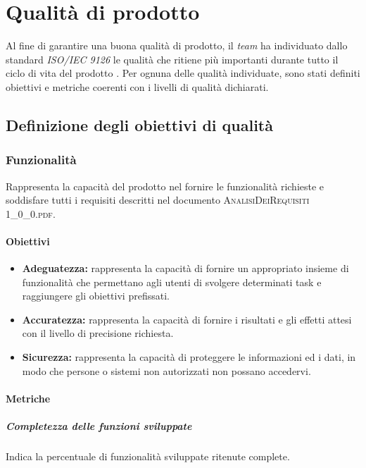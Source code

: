 \newpage
\section{Qualità di prodotto}
	
Al fine di garantire una buona qualità di prodotto, il \textit{team} ha individuato dallo standard \textit{ISO/IEC 9126} le qualità che ritiene più importanti durante tutto il ciclo di vita del prodotto \progetto. Per ognuna delle qualità individuate, sono stati definiti obiettivi e metriche coerenti con i livelli di qualità dichiarati.

\subsection{Definizione degli obiettivi di qualità}

	\subsubsection{Funzionalità}
	Rappresenta la capacità del prodotto nel fornire le funzionalità richieste e soddisfare tutti i requisiti descritti nel documento \textsc{AnalisiDeiRequisiti 1\_0\_0.pdf}.
		
		\paragraph{Obiettivi}
			\begin{itemize}
				\item \textbf{Adeguatezza:} rappresenta la capacità di fornire un appropriato insieme di funzionalità che permettano agli utenti di svolgere determinati task e raggiungere gli obiettivi prefissati.
				\item \textbf{Accuratezza:} rappresenta la capacità di fornire i risultati e gli effetti attesi con il livello di precisione richiesta.
				\item \textbf{Sicurezza:} rappresenta la capacità di proteggere le informazioni ed i dati, in modo che persone o sistemi non autorizzati non possano accedervi.
			\end{itemize}
		
		\paragraph{Metriche}
			\subparagraph{Completezza delle funzioni sviluppate}
			Indica la percentuale di funzionalità sviluppate ritenute complete.
			
